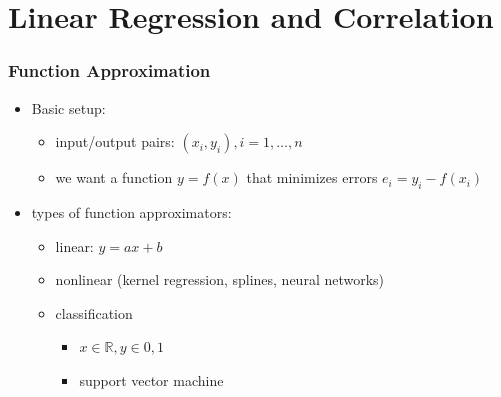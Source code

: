 \documentclass[10pt]{article}
\begin{document}
\newpage
\part{Linear Regression and Correlation}

\section{Function Approximation}
\begin{itemize}
    \item Basic setup:
        \begin{itemize}
            \item input/output pairs: $(x_i, y_i), i = 1, \ldots, n$
            \item we want a function $y=f(x)$ that minimizes errors $e_i = y_i - f(x_i)$
        \end{itemize}
    \item types of function approximators:
        \begin{itemize}
            \item linear: $y=ax+b$ 
            \item nonlinear (kernel regression, splines, neural networks)
            \item classification
                \begin{itemize}
                    \item $x \in \mathbb{R}, y \in {0,1}$ 
                    \item support vector machine
                \end{itemize}
        \end{itemize}
\end{itemize}
\end{document}
